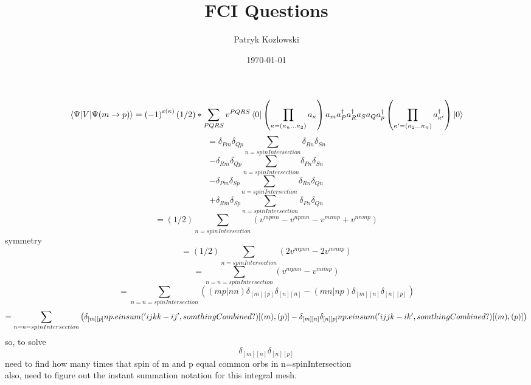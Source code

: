 \documentclass[12pt]{article}
\title{FCI Questions}
\author{Patryk Kozlowski}
\date{\today}
\begin{document}
\maketitle
\begin{equation}
    \mel{\Psi }{V}{\Psi (m\rightarrow p)}=\left(-1\right)^{\varepsilon\left(\kappa\right)}(1/2)*\sum_{PQRS} v^{PQRS }\\
    \bra{0}\left(\prod_{\kappa=\left(\kappa_{n}\dots\kappa_{2}\right)}a_{\kappa}\right)
        a_{m}a^{\dag}_{P }a^{\dag}_{R }a_{S }a_{Q }a^{\dag}_{p}
    \left(\prod_{\kappa^{\prime}=\left(\kappa_{2}\dots\kappa_{n}\right)}a^{\dag}_{\kappa^{\prime}}\right)\ket{0}
\end{equation}
\begin{equation}
    =\delta_{P m}\delta_{Q p}\sum_{n=spinIntersection} \delta_{R n}\delta_{S n}
\end{equation}
\begin{equation}
    -\delta_{R m}\delta_{Q p}\sum_{n=spinIntersection} \delta_{P n}\delta_{S n}
\end{equation}
\begin{equation}
    -\delta_{P m}\delta_{S p}\sum_{n=spinIntersection} \delta_{R n}\delta_{Q n}
\end{equation}
\begin{equation}
    +\delta_{R m}\delta_{S p}\sum_{n=spinIntersection} \delta_{P n}\delta_{Q n}
\end{equation}
\begin{equation}
    =(1/2)\sum_{n=spinIntersection}\left(v^{mpnn}-v^{npmn}-v^{mnnp}+v^{nnmp}\right)
\end{equation}
symmetry
\begin{equation}
    =(1/2)\sum_{n=spinIntersection}\left(2v^{mpnn}-2v^{mnnp}\right)
\end{equation}
\begin{equation}
    =\sum_{n=n=spinIntersection}\left(v^{mpnn}-v^{mnnp}\right) 
\end{equation}
\begin{equation}
    =\sum_{n=n=spinIntersection}\left((mp|nn)\delta _{[m][p]}\delta _{[n][n]}-(mn|np)\delta _{[m][n]}\delta _{[n][p]}\right)
\end{equation}
\begin{dmath}
    =\sum_{n=n=spinIntersection}\left(\delta _{[m][p]}np.einsum('ijkk-ij',somthingCombined?)[(m),(p)]\\-\delta _{[m][n]}\delta _{[n][p]}np.einsum('ijjk-ik',somthingCombined?)[(m),(p)]\right)
\end{dmath}
 so, to solve
\begin{equation}
    \delta _{[m][n]}\delta _{[n][p]}
\end{equation}
need to find how many times that spin of m and p equal common orbs in n=spinIntersection\\
also, need to figure out the instant summation notation for this integral mesh.
\end{document}
